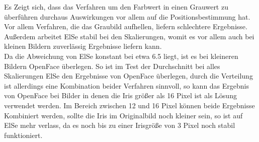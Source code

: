 Es Zeigt sich, dass das Verfahren um den Farbwert in einen Grauwert zu überführen durchaus Auswirkungen vor allem auf die Positionsbestimmung hat. Vor allem Verfahren, die das Graubild aufhellen, liefern schlechtere Ergebnisse.\\
Außerdem arbeitet ElSe stabil bei den Skalierungen, womit es vor allem auch bei kleinen Bildern zuverlässig Ergebnisse liefern kann.\\
Da die Abweichung von ElSe konstant bei etwa 6.5 liegt, ist es bei kleineren Bildern OpenFace überlegen. So ist im Test der Durchschnitt bei alles Skalierungen ElSe den Ergebnisse von OpenFace überlegen, durch die Verteilung ist allerdings eine Kombination beider Verfahren sinnvoll, so kann das Ergebnis von OpenFace bei Bilder in denen die Iris größer als 16 Pixel ist als Lösung verwendet werden. Im Bereich zwischen 12 und 16 Pixel können beide Ergebnisse Kombiniert werden, sollte die Iris im Originalbild noch kleiner sein, so ist auf ElSe mehr verlass, da es noch bis zu einer Irisgröße von 3 Pixel noch stabil funktioniert.
